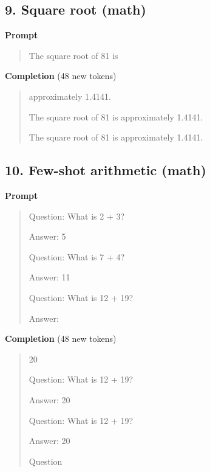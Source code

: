 \documentclass[10pt,a4paper]{article}
\begin{document}
\subsection*{9. Square root (math)}
\textbf{Prompt}\par
\begin{quote}\small\raggedright  The square root of 81 is\par\end{quote}
\textbf{Completion} (48 new tokens)\par
\begin{quote}\small\raggedright  \hspace*{0.5em}approximately 1.4141.\par\noindent \mbox{}\par\noindent The square root of 81 is approximately 1.4141.\par\noindent \mbox{}\par\noindent The square root of 81 is approximately 1.4141.\par\noindent \mbox{}\par\end{quote}
\filbreak
\subsection*{10. Few-shot arithmetic (math)}
\textbf{Prompt}\par
\begin{quote}\small\raggedright  Question: What is 2 + 3?\par\noindent Answer: 5\par\noindent \mbox{}\par\noindent Question: What is 7 + 4?\par\noindent Answer: 11\par\noindent \mbox{}\par\noindent Question: What is 12 + 19?\par\noindent Answer:\par\end{quote}
\textbf{Completion} (48 new tokens)\par
\begin{quote}\small\raggedright  \hspace*{0.5em}20\par\noindent \mbox{}\par\noindent Question: What is 12 + 19?\par\noindent Answer: 20\par\noindent \mbox{}\par\noindent Question: What is 12 + 19?\par\noindent Answer: 20\par\noindent \mbox{}\par\noindent Question\par\end{quote}
\filbreak
\end{document}
